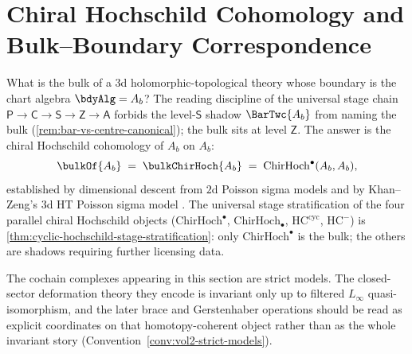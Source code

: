 \section{Chiral Hochschild Cohomology and Bulk--Boundary Correspondence}
\label{sec:chiral_hochschild}
\label{sec:chiral_hochschild_expanded}
\label{sec:derived-center}
\label{chap:hochschild}%
\label{ch:hochschild}%
\label{ch:theory-hochschild}%

\noindent
What is the bulk of a $3$d holomorphic-topological theory whose
boundary is the chart algebra $\bdyAlg = A_b$? The reading discipline
of the universal stage chain
$\mathsf{P} \to \mathsf{C} \to \mathsf{S} \to \mathsf{Z} \to \mathsf{A}$
forbids the level-$\mathsf{S}$ shadow $\BarTwc{A_b}$ from naming the
bulk \textup(\cref{rem:bar-vs-centre-canonical}\textup); the bulk
sits at level $\mathsf{Z}$. The answer is the chiral Hochschild
cohomology of $A_b$ on $A_b$:
\[
\bulkOf{A_b}
 \;=\;
 \bulkChirHoch{A_b}
 \;=\;
 \mathrm{ChirHoch}^\bullet(A_b, A_b),
\]
established by dimensional descent from $2$d Poisson sigma models
and by Khan--Zeng's $3$d HT Poisson sigma model \cite{KZ25}. The
universal stage stratification of the four parallel chiral
Hochschild objects
\textup($\mathrm{ChirHoch}^\bullet$, $\mathrm{ChirHoch}_\bullet$,
$\mathrm{HC}^{\mathrm{cyc}}$, $\mathrm{HC}^-$\textup) is
\cref{thm:cyclic-hochschild-stage-stratification}: only
$\mathrm{ChirHoch}^\bullet$ is the bulk; the others are shadows
requiring further licensing data.

\begin{remark}
\label{rem:hochschild-linf-native}
The cochain complexes appearing in this section are strict models. The
closed-sector deformation theory they encode is invariant only up to
filtered $L_\infty$ quasi-isomorphism, and the later brace and
Gerstenhaber operations should be read as explicit coordinates on that
homotopy-coherent object rather than as the whole invariant story
(Convention~\ref{conv:vol2-strict-models}).
\end{remark}

